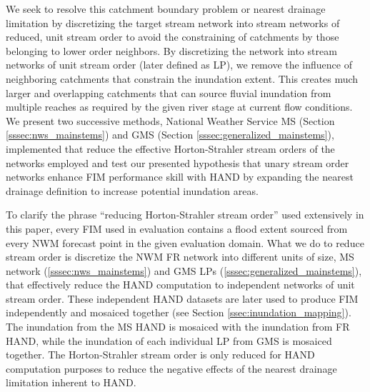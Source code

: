 \documentclass[draft]{dependencies/agujournal2019}
\begin{document}
We seek to resolve this catchment boundary problem or nearest drainage limitation by discretizing the target stream network into stream networks of reduced, unit stream order to avoid the constraining of catchments by those belonging to lower order neighbors.
By discretizing the network into stream networks of unit stream order (later defined as LP), we remove the influence of neighboring catchments that constrain the inundation extent.
This creates much larger and overlapping catchments that can source fluvial inundation from multiple reaches as required by the given river stage at current flow conditions.
We present two successive methods, National Weather Service MS (Section \ref{sssec:nws_mainstems}) and GMS (Section \ref{sssec:generalized_mainstems}), implemented that reduce the effective Horton-Strahler stream orders of the networks employed and test our presented hypothesis that unary stream order networks enhance FIM performance skill with HAND by expanding the nearest drainage definition to increase potential inundation areas.

To clarify the phrase ``reducing Horton-Strahler stream order'' used extensively in this paper, every FIM used in evaluation contains a flood extent sourced from every NWM forecast point in the given evaluation domain.
What we do to reduce stream order is discretize the NWM FR network into different units of size, MS network (\ref{sssec:nws_mainstems}) and GMS LPs (\ref{sssec:generalized_mainstems}), that effectively reduce the HAND computation to independent networks of unit stream order.
These independent HAND datasets are later used to produce FIM independently and mosaiced together (see Section \ref{ssec:inundation_mapping}).
The inundation from the MS HAND is mosaiced with the inundation from FR HAND, while the inundation of each individual LP from GMS is mosaiced together.
The Horton-Strahler stream order is only reduced for HAND computation purposes to reduce the negative effects of the nearest drainage limitation inherent to HAND.
%
\end{document}
